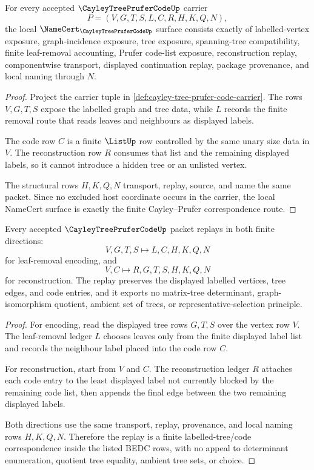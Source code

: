 \begin{theorem}
\label{thm:cayley-tree-prufer-code-obligations}
For every accepted $\CayleyTreePruferCodeUp$ carrier
$$
P=(V,G,T,S,L,C,R,H,K,Q,N),
$$
the local $\NameCert_{\CayleyTreePruferCodeUp}$ surface consists exactly of labelled-vertex exposure, graph-incidence exposure, tree exposure, spanning-tree compatibility, finite leaf-removal accounting, Prufer code-list exposure, reconstruction replay, componentwise transport, displayed continuation replay, package provenance, and local naming through $N$.
\end{theorem}
\begin{proof}
Project the carrier tuple in \autoref{def:cayley-tree-prufer-code-carrier}. The rows $V,G,T,S$ expose the labelled graph and tree data, while $L$ records the finite removal route that reads leaves and neighbours as displayed labels.

The code row $C$ is a finite $\ListUp$ row controlled by the same unary size data in $V$. The reconstruction row $R$ consumes that list and the remaining displayed labels, so it cannot introduce a hidden tree or an unlisted vertex.

The structural rows $H,K,Q,N$ transport, replay, source, and name the same packet. Since no excluded host coordinate occurs in the carrier, the local NameCert surface is exactly the finite Cayley--Prufer correspondence route.
\end{proof}

\begin{theorem}
\label{thm:cayley-tree-prufer-code-replay}
Every accepted $\CayleyTreePruferCodeUp$ packet replays in both finite directions:
$$
V,G,T,S \longmapsto L,C,H,K,Q,N
$$
for leaf-removal encoding, and
$$
V,C \longmapsto R,G,T,S,H,K,Q,N
$$
for reconstruction. The replay preserves the displayed labelled vertices, tree edges, and code entries, and it exports no matrix-tree determinant, graph-isomorphism quotient, ambient set of trees, or representative-selection principle.
\end{theorem}
\begin{proof}
For encoding, read the displayed tree rows $G,T,S$ over the vertex row $V$. The leaf-removal ledger $L$ chooses leaves only from the finite displayed label list and records the neighbour label placed into the code row $C$.

For reconstruction, start from $V$ and $C$. The reconstruction ledger $R$ attaches each code entry to the least displayed label not currently blocked by the remaining code list, then appends the final edge between the two remaining displayed labels.

Both directions use the same transport, replay, provenance, and local naming rows $H,K,Q,N$. Therefore the replay is a finite labelled-tree/code correspondence inside the listed BEDC rows, with no appeal to determinant enumeration, quotient tree equality, ambient tree sets, or choice.
\end{proof}

